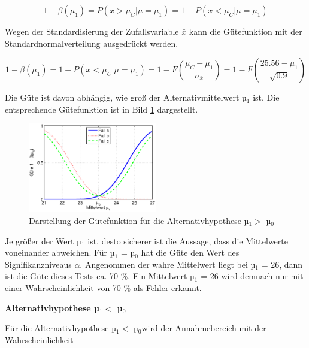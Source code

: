 \begin{equation}\label{eq:sixsixtysix}
1-\beta \left(\mu _{1} \right)=P\left(\bar{x}>\mu _{C} |\mu =\mu _{1} \right)=1-P\left(\bar{x}<\mu _{C} |\mu =\mu _{1} \right)
\end{equation}

\noindent Wegen der Standardisierung der Zufallsvariable $\bar{x}$ kann die G\"{u}tefunktion mit der Standardnormalverteilung ausgedr\"{u}ckt werden.

\begin{equation}\label{eq:sixsixtyseven}
1-\beta \left(\mu _{1} \right)=1-P\left(\bar{x}<\mu _{C} |\mu =\mu _{1} \right)=1-F\left(\dfrac{\mu _{C} -\mu _{1} }{\sigma _{\bar{x}} } \right)=1-F\left(\dfrac{25.56-\mu _{1} }{\sqrt{0.9} } \right)
\end{equation}

\noindent Die G\"{u}te ist davon abh\"{a}ngig, wie gro{\ss} der Alternativmittelwert µ$_{1}$ ist. Die entsprechende G\"{u}tefunktion ist in Bild \ref{fig:HypothesentestFehler1} dargestellt.

\noindent 
\begin{figure}[H]
  \centerline{\includegraphics[width=0.5\textwidth]{Kapitel6/Bilder/image10}}
  \caption{Darstellung der G\"{u}tefunktion f\"{u}r die Alternativhypothese µ$_{1} >$ µ$_{0}$}
  \label{fig:HypothesentestFehler1}
\end{figure}

\noindent Je gr\"{o}{\ss}er der Wert µ$_{1}$ ist, desto sicherer ist die Aussage, dass die Mittelwerte voneinander abweichen. F\"{u}r µ$_{1}$ = µ$_{0}$ hat die G\"{u}te den Wert des Signifikanzniveaus $\alpha$. Angenommen der wahre Mittelwert liegt bei µ$_{1}$ = 26, dann ist die G\"{u}te dieses Tests ca. 70 \%. Ein Mittelwert µ$_{1}$ = 26 wird demnach nur mit einer Wahrscheinlichkeit von 70 \% als Fehler erkannt.

\clearpage

{\selectfont
\noindent\textbf{Alternativhypothese µ$_{1} <$ µ$_{0}$}}\smallskip

\noindent F\"{u}r die Alternativhypothese µ$_{1} <$ µ$_{0}$wird der Annahmebereich mit der Wahrscheinlichkeit

